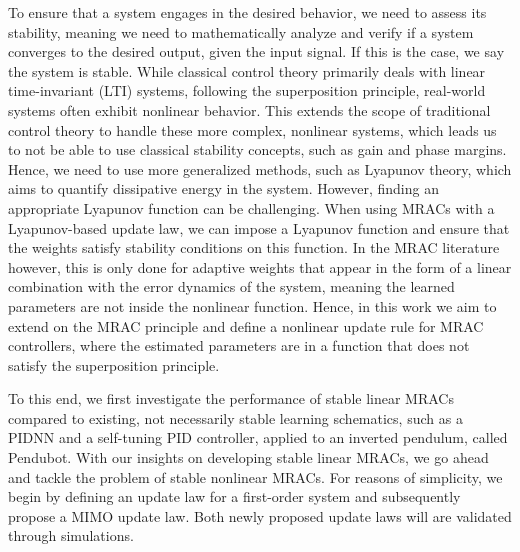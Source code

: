 To ensure that a system engages in the desired behavior, we need to assess its stability, meaning we need to mathematically analyze and verify if a system converges to the desired output, given the input signal. If this is the case, we say the system is stable. While classical control theory primarily deals with linear time-invariant (LTI) systems, following the superposition principle, real-world systems often exhibit nonlinear behavior. This extends the scope of traditional control theory to handle these more complex, nonlinear systems, which leads us to not be able to use classical stability concepts, such as gain and phase margins. Hence, we need to use more generalized methods, such as Lyapunov theory, which aims to quantify dissipative energy in the system. However, finding an appropriate Lyapunov function can be challenging. When using MRACs with a Lyapunov-based update law, we can impose a Lyapunov function and ensure that the weights satisfy stability conditions on this function. In the MRAC literature however, this is only done for adaptive weights that appear in the form of a linear combination with the error dynamics of the system, meaning the learned parameters are not inside the nonlinear function. Hence, in this work we aim to extend on the MRAC principle and define a nonlinear update rule for MRAC controllers, where the estimated parameters are in a function that does not satisfy the superposition principle.

To this end, we first investigate the performance of stable linear MRACs compared to existing, not necessarily stable learning schematics, such as a PIDNN and a self-tuning PID controller, applied to an inverted pendulum, called Pendubot. With our insights on developing stable linear MRACs, we go ahead and tackle the problem of stable nonlinear MRACs. For reasons of simplicity, we begin by defining an update law for a first-order system and subsequently propose a MIMO update law. Both newly proposed update laws will are validated through simulations.